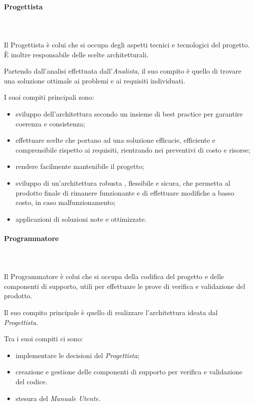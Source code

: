    			\paragraph{Progettista} \mbox{}\\ \mbox{}\\
   			Il Progettista è colui che si occupa degli aspetti tecnici e tecnologici del progetto. \`{E} inoltre responsabile delle scelte architetturali.

   			Partendo dall'analisi effettuata dall'\textit{Analista}, il suo compito è quello di trovare una soluzione ottimale ai problemi e ai requisiti individuati.

   			I suoi compiti principali sono:
   			\begin{itemize}
   				\item sviluppo dell'architettura secondo un insieme di best practice per garantire coerenza e consistenza;
   				\item effettuare scelte che portano ad una soluzione efficacie, efficiente e comprensibile rispetto ai requisiti, rientrando nei preventivi di costo e risorse;
   				\item rendere facilmente mantenibile il progetto;
   				\item sviluppo di un'architettura robusta , flessibile e sicura, che permetta al prodotto finale di rimanere funzionante e di effettuare modifiche a basso costo, in caso malfunzionamento;
   				\item applicazioni di soluzioni note e ottimizzate.
   			\end{itemize}
   			\paragraph{Programmatore} \mbox{}\\ \mbox{}\\
   			Il Programmatore è colui che si occupa della codifica del progetto e delle componenti di supporto, utili per effettuare le prove di verifica e validazione del prodotto.

   			Il suo compito principale è quello di realizzare l'architettura ideata dal \textit{Progettista}.

   			Tra i suoi compiti ci sono:
   			\begin{itemize}
   				\item implementare le decisioni del \textit{Progettista};
   				\item creazione e gestione delle componenti di supporto per verifica e validazione del codice.
   				\item stesura del \textit{Manuale Utente}.
   			\end{itemize}

